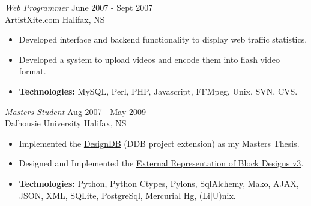 \documentclass[line,margin]{res}
\begin{document}
\begin{resume}
   {\sl Web Programmer} \hfill June 2007 - Sept 2007 \\
    ArtistXite.com \hfill Halifax, NS \smallskip
    \begin{itemize}  \itemsep -2pt %
     \item Developed interface and backend functionality to display
               web traffic statistics.
     \item Developed a system to upload videos and encode them
                into flash video format.
     \item {\bf Technologies:}\hspace{4pt}
        MySQL, Perl, PHP, Javascript, FFMpeg, Unix, SVN, CVS.
    \end{itemize}

   {\sl Masters Student} \hfill Aug 2007 - May 2009 \\
     Dalhousie University \hfill Halifax, NS \smallskip
      \begin{itemize}  \itemsep -2pt %
       \item Implemented the
       \href{http://batman.cs.dal.ca/~peter/designdb/}{DesignDB} (DDB
       project extension) as my Masters Thesis.
       \item Designed and Implemented the
       \href{http://designtheory.org/library/extrep/}{External
       Representation of Block Designs v3}.
       \item {\bf Technologies:} \hspace{1pt}
        Python, Python Ctypes, Pylons, SqlAlchemy, Mako, AJAX, \newline
        \hspace*{72pt} JSON, XML, SQLite, PostgreSql, Mercurial Hg,
        (Li$|$U)nix.
    \end{itemize}


\end{resume}
\end{document}
